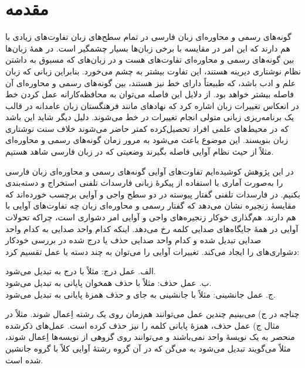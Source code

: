 \documentclass[12pt,onecolumn,a4paper]{article}
\begin{document}
    \section{مقدمه}
    گونه‌های رسمی و محاوره‌ای زبان فارسی در تمام سطح‌های زبان تفاوت‌های زیادی با هم دارند که این امر در مقایسه با برخی زبان‌ها بسیار چشمگیر است. در همهٔ زبان‌ها بین گونه‌های رسمی و محاوره‌ای تفاوت‌های هست و در زبان‌های که مسبوق به داشتن نظام نوشتاری دیرینه هستند، این تفاوت بیشتر به چشم می‌خورد. بنابراین زبانی که زبان علم و ادب باشد، که طبیعتاً دارای خط نیز هستند، بین گونه‌های رسمی و محاوره‌ای آن فاصله بیشتر خواهد بود. از دلایل این فاصله می‌توان به محافظه‌کارانه عمل کردن خط در انعکاس تغییرات زبان اشاره کرد که نهادهای مانند فرهنگستان زبان عامدانه در قالب یک برنامه‌ریزی زبانی متولی انجام تغییرات در خط می‌شوند. دلیل دیگر شاید این باشد که در محیط‌های علمی افراد تحصیل‌کرده کمتر حاضر می‌شوند خلاف سنت نوشتاری زبان بنویسند. این موضوع باعث می‌شود به مرور زمان گونه‌های رسمی و محاوره‌ای مثلاً از حیث نظام آوایی فاصله بگیرند وضعیتی که در زبان فارسی شاهد هستیم.
    \par
    در این پژوهش کوشیده‌ایم تفاوت‌های آوایی گونه‌های رسمی و محاوره‌ای زبان فارسی را به‌صورت آماری با استفاده از پیکرهٔ زبانی فارسدات تلفنی  استخراج و دسته‌بندی بکنیم. در فارسدات تلفنی گفتار پیوسته در دو سطح واجی و آوایی برچسب خورده‌اند که مقایسهٔ زنجیره نشان می‌دهد که گفتار رسمی و محاوره‌ای زبان چه تفاوت‌های آوایی با هم دارند. هم‌گذاری خوکار زنجیره‌های واجی و آوایی امر دشواری است، چراکه تحولات آوایی در همهٔ جایگاه‌های صدایی کلمه رخ می‌دهد. اینکه کدام واحد صدایی به کدام واحد صدایی تبدیل شده و کدام واحد صدایی حذف یا درج شده در بررسی خودکار دشواری‌های را ایجاد می‌کند. تغییرات آوایی را می‌توان به چند دسته یا عمل تقسیم کرد:
    \par\noindent
    الف. عمل درج: مثلاً  با درج  به  تبدیل می‌شود. \\
    ب. عمل حذف: مثلاً  با حذف همخوان پایانی به  تبدیل می‌شود. \\
    ج. عمل جانشینی: مثلاً  با جانشینی  به جای  و حذف همزهٔ پایانی به  تبدیل می‌شود.
    \par
    چناچه در ج) می‌بینیم چندین عمل می‌توانند هم‌زمان روی یک رشته اِعمال شوند. مثلاً در مثال ج) عمل حذف، همزۀ پایانی کلمه را نیز حذف کرده است. عمل‌های ذکرشده منحصر به یک نویسۀ واحد نمی‌باشند و می‌توانند روی گروهی از نویسه‌ها اِعمال شوند، مثلاً می‌گویند تبدیل می‌شود به می‌گن که در آن گروه رشتهٔ آوایی  کلاً با گروه  جانشین شده است.
    \par
\end{document}

